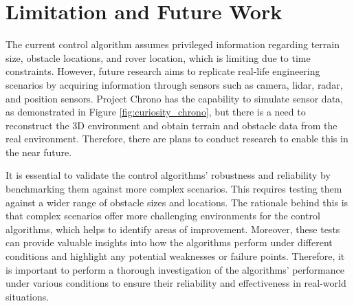 \documentclass{article}
\begin{document}
\section{Limitation and Future Work}


The current control algorithm assumes privileged information regarding terrain size, obstacle locations, and rover location, which is limiting due to time constraints. However, future research aims to replicate real-life engineering scenarios by acquiring information through sensors such as camera, lidar, radar, and position sensors. Project Chrono has the capability to simulate sensor data, as demonstrated in Figure \ref{fig:curiosity_chrono}, but there is a need to reconstruct the 3D environment and obtain terrain and obstacle data from the real environment. Therefore, there are plans to conduct research to enable this in the near future.


It is essential to validate the control algorithms' robustness and reliability by benchmarking them against more complex scenarios. This requires testing them against a wider range of obstacle sizes and locations. The rationale behind this is that complex scenarios offer more challenging environments for the control algorithms, which helps to identify areas of improvement. Moreover, these tests can provide valuable insights into how the algorithms perform under different conditions and highlight any potential weaknesses or failure points. Therefore, it is important to perform a thorough investigation of the algorithms' performance under various conditions to ensure their reliability and effectiveness in real-world situations.



\end{document}
